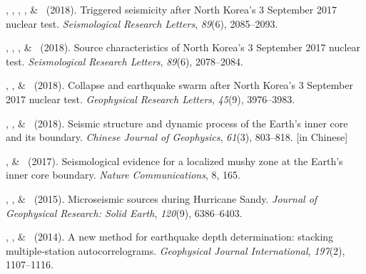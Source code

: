 \begin{etaremune}
\item
    \JYao, \Me\CF, \ZLu, \LSun, \& \LWen\ (2018).
    Triggered seismicity after North Korea's 3 September 2017 nuclear test.
    \emph{Seismological Research Letters}, \emph{89}(6), 2085--2093.
\item
    \JYao, \Me\CF, \LSun, \& \LWen\ (2018).
    Source characteristics of North Korea's 3 September 2017 nuclear test.
    \emph{Seismological Research Letters}, \emph{89}(6), 2078--2084.
\item
    \Me\CS, \JYao, \& \LWen\ (2018).
    Collapse and earthquake swarm after North Korea's 3 September 2017 nuclear test.
    \emph{Geophysical Research Letters}, \emph{45}(9), 3976--3983.
\item
    \LWen, \Me, \& \JYao\ (2018).
    Seismic structure and dynamic process of the Earth's inner core and its boundary.
    \emph{Chinese Journal of Geophysics}, \emph{61}(3), 803--818.
     [in Chinese]
\item
    \Me, \& \LWen\ (2017).
    Seismological evidence for a localized mushy zone at the Earth's inner core boundary.
    \emph{Nature Communications}, 8, 165.
\item
    \XChen, \Me, \& \LWen\ (2015).
    Microseismic sources during Hurricane Sandy.
    \emph{Journal of Geophysical Research: Solid Earth}, \emph{120}(9), 6386--6403.
\item \MZhang, \Me, \& \LWen\ (2014).
    A new method for earthquake depth determination: stacking multiple-station autocorrelograms.
    \emph{Geophysical Journal International}, \emph{197}(2), 1107--1116.
\end{etaremune}


